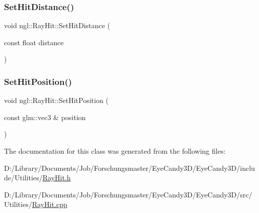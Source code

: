 \mbox{\label{classngl_1_1_ray_hit_a17e409f87f691321d731879c9def7973}} 
\subsubsection{\texorpdfstring{Set\+Hit\+Distance()}{SetHitDistance()}}
{\footnotesize\ttfamily void ngl\+::\+Ray\+Hit\+::\+Set\+Hit\+Distance (\begin{DoxyParamCaption}\item[{const float}]{distance }\end{DoxyParamCaption})}

\mbox{\label{classngl_1_1_ray_hit_a8619add65dbfd95308bfc5d82389e903}} 
\subsubsection{\texorpdfstring{Set\+Hit\+Position()}{SetHitPosition()}}
{\footnotesize\ttfamily void ngl\+::\+Ray\+Hit\+::\+Set\+Hit\+Position (\begin{DoxyParamCaption}\item[{const glm\+::vec3 \&}]{position }\end{DoxyParamCaption})}



The documentation for this class was generated from the following files\+:\begin{DoxyCompactItemize}
\item 
D\+:/\+Library/\+Documents/\+Job/\+Forschungsmaster/\+Eye\+Candy3\+D/\+Eye\+Candy3\+D/include/\+Utilities/\mbox{\hyperlink{_ray_hit_8h}{Ray\+Hit.\+h}}\item 
D\+:/\+Library/\+Documents/\+Job/\+Forschungsmaster/\+Eye\+Candy3\+D/\+Eye\+Candy3\+D/src/\+Utilities/\mbox{\hyperlink{_ray_hit_8cpp}{Ray\+Hit.\+cpp}}\end{DoxyCompactItemize}
